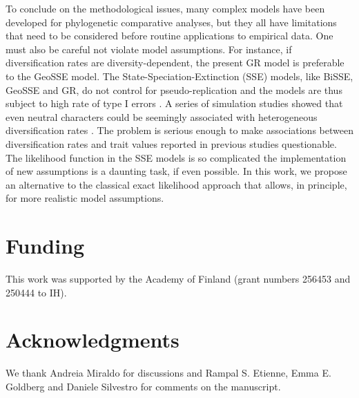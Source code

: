 To conclude on the methodological issues, many complex models have been developed for phylogenetic comparative analyses, but they all have limitations that need to be considered before routine applications to empirical data.  
One must also be careful not violate model assumptions. 
For instance, if diversification rates are diversity-dependent, the present GR model is preferable to the GeoSSE model. 
The State-Speciation-Extinction (SSE) models, like BiSSE, GeoSSE and GR, do not control for pseudo-replication and the models are thus subject to high rate of type I errors \citep{Maddison2015, Rabosky2015}. 
A series of simulation studies showed that even neutral characters could be seemingly associated with heterogeneous diversification rates \citep{Rabosky2015}. 
The problem is serious enough to make associations between diversification rates and trait values reported in previous studies questionable. 
The likelihood function in the SSE models is so complicated the implementation of new assumptions is a daunting task, if even possible. 
In this work, we propose an alternative to the classical exact likelihood approach that allows, in principle, for more realistic model assumptions.  

\section*{Funding}
This work was supported by the Academy of Finland (grant numbers 256453 and 250444 to IH).

\section*{Acknowledgments}
We thank Andreia Miraldo for discussions and Rampal S. Etienne, Emma E. Goldberg and Daniele Silvestro for comments on the manuscript. 

